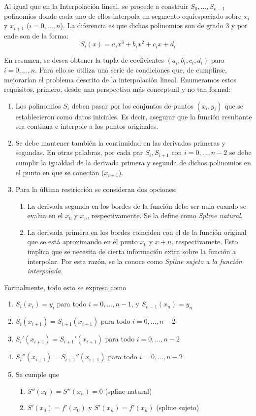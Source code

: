 Al igual que en la Interpolaci\'on lineal, se procede a construir $S_0, \ldots, S_{n - 1}$ polinomios donde cada uno de ellos interpola un segmento equiespaciado sobre $x_i$ y $x_{i + 1}$ ($i = 0, \ldots, n$). La diferencia es que dichos polinomios son de grado 3 y por ende son de la forma: \[ S_i(x) = a_i x^3 + b_i x^2 + c_i x + d_i \]

En resumen, se desea obtener la tupla de coeficientes $(a_i,b_i,c_i,d_i)$ para $i = 0, \ldots, n$. Para ello se utiliza una serie de condiciones que, de cumplirse, mejorarían el problema descrito de la interpolación lineal. Enumeramos estos requisitos, primero, desde una perspectiva m\'as conceptual y no tan formal:

\begin{enumerate}
	\item Los polinomios $S_i$ deben pasar por los conjuntos de puntos $(x_i,y_i)$ que se establecieron como datos iniciales. Es decir, asegurar que la funci\'on resultante sea continua e interpole a los puntos originales.
	\item Se debe mantener tambi\'en la continuidad en las derivadas primeras y segundas. En otras palabras, por cada par $S_i, S_{i+1}$ con $i = 0, \ldots, n-2$ se debe cumplir la igualdad de la derivada primera y segunda de dichos polinomios en el punto en que se conectan ($x_{i+1}$).
	\item Para la \'ultima restricci\'on se consideran dos opciones:
		\begin{enumerate}
			\item La derivada segunda en los bordes de la funci\'on debe ser nula cuando se evalua en el $x_0$ y $x_n$, respectivamente. Se la define como \textit{Spline natural}.
			\item La derivada primera en los bordes coinciden con el de la funci\'on original que se est\'a aproximando en el punto $x_0$ y $x+n$, respectivamete. Esto implica que se necesita de cierta informaci\'on extra sobre la funci\'on a interpolar. Por esta raz\'on, se la conoce como \textit{Spline sujeto a la funci\'on interpolada}.  
		\end{enumerate}
\end{enumerate}

Formalmente, todo esto se expresa como

\begin{enumerate}
\item $S_i(x_i) = y_i$ para todo $i = 0, \ldots, n-1$, y $S_{n-1}(x_n)=y_n$
\item $S_i(x_{i + 1}) = S_{i+1}(x_{i + 1})$ para todo $i = 0, \ldots, n - 2$
\item $S_i'(x_{i + 1}) = S_{i+1}'(x_{i + 1})$ para todo $i = 0, \ldots, n - 2$
\item $S_i''(x_{i + 1}) = S_{i+1}''(x_{i + 1})$ para todo $i = 0, \ldots, n - 2$
\item Se cumple que
\begin{enumerate}
\item $S''(x_0) = S''(x_n) = 0$ (spline natural)
\item $S'(x_0) = f'(x_0)$ y $S'(x_n) = f'(x_n)$ (spline sujeto)
\end{enumerate} 
\end{enumerate}

